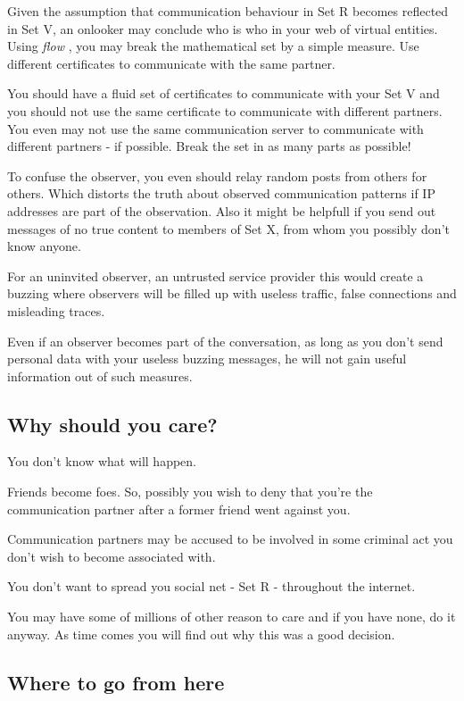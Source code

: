 \documentclass[twoside,a4paper,english,12pt,authoryear,openright]{book}
\newcommand{\flow}{\textit{flow} }
\begin{document}
Given the assumption that communication behaviour in Set R becomes reflected in Set V, an onlooker may conclude who is who in your web of virtual entities. Using \flow, you may break the mathematical set by a simple measure. Use different certificates to communicate with the same partner.

You should have a fluid set of certificates to communicate with your Set V and you should not use the same certificate to communicate with different partners. You even may not use the same communication server to communicate with different partners - if possible. Break the set in as many parts as possible!

To confuse the observer, you even should relay random posts from others for others. Which distorts the truth about observed communication patterns if IP addresses are part of the observation. Also it might be helpfull if you send out messages of no true content to members of Set X, from whom you possibly don't know anyone.

For an uninvited observer, an untrusted service provider this would create a buzzing where observers will be filled up with useless traffic, false connections and misleading traces.

Even if an observer becomes part of the conversation, as long as you don't send personal data with your useless buzzing messages, he will not gain useful information out of such measures.


\subsection{Why should you care?}

You don't know what will happen.

Friends become foes. So, possibly you wish to deny that you're the communication partner after a former friend went against you.

Communication partners may be accused to be involved in some criminal act you don't wish to become associated with.

You don't want to spread you social net - Set R - throughout the internet.

You may have some of millions of other reason to care and if you have none, do it anyway. As time comes you will find out why this was a good decision.

\subsection{Where to go from here}
\end{document}
